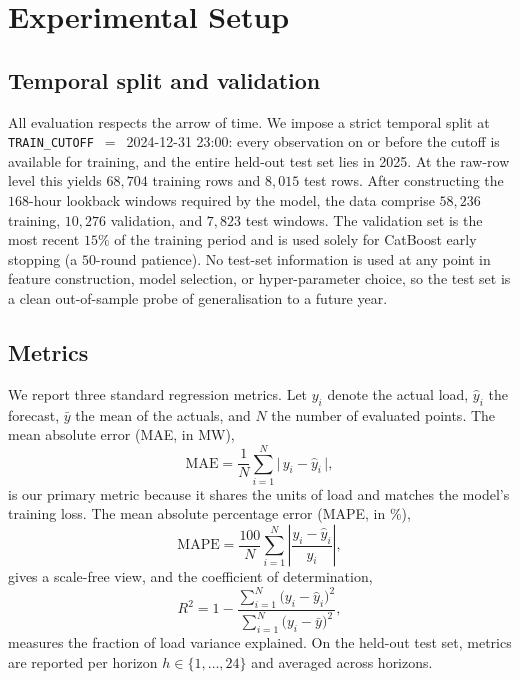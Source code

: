 \section{Experimental Setup}\label{sec:setup}

\subsection{Temporal split and validation}
All evaluation respects the arrow of time. We impose a strict temporal split at
\texttt{TRAIN\_CUTOFF}~$=$~2024-12-31 23:00: every observation on or before the
cutoff is available for training, and the entire held-out test set lies in 2025.
At the raw-row level this yields $68{,}704$ training rows and $8{,}015$ test rows.
After constructing the $168$-hour lookback windows required by the model, the data
comprise $58{,}236$ training, $10{,}276$ validation, and $7{,}823$ test windows. The
validation set is the most recent $15\%$ of the training period and is used solely
for CatBoost early stopping (a $50$-round patience). No test-set information is used
at any point in feature construction, model selection, or hyper-parameter choice,
so the test set is a clean out-of-sample probe of generalisation to a future year.

\subsection{Metrics}
We report three standard regression metrics. Let $y_i$ denote the actual load,
$\hat{y}_i$ the forecast, $\bar{y}$ the mean of the actuals, and $N$ the number of
evaluated points. The mean absolute error (MAE, in MW),
\begin{equation}
\mathrm{MAE} = \frac{1}{N}\sum_{i=1}^{N}\bigl|\,y_i-\hat{y}_i\,\bigr|,
\end{equation}
is our primary metric because it shares the units of load and matches the model's
training loss. The mean absolute percentage error (MAPE, in \%),
\begin{equation}
\mathrm{MAPE} = \frac{100}{N}\sum_{i=1}^{N}\left|\frac{y_i-\hat{y}_i}{y_i}\right|,
\end{equation}
gives a scale-free view, and the coefficient of determination,
\begin{equation}
R^{2} = 1 - \frac{\sum_{i=1}^{N}\bigl(y_i-\hat{y}_i\bigr)^{2}}
                  {\sum_{i=1}^{N}\bigl(y_i-\bar{y}\bigr)^{2}},
\end{equation}
measures the fraction of load variance explained. On the held-out test set, metrics
are reported per horizon $h \in \{1,\dots,24\}$ and averaged across horizons.

